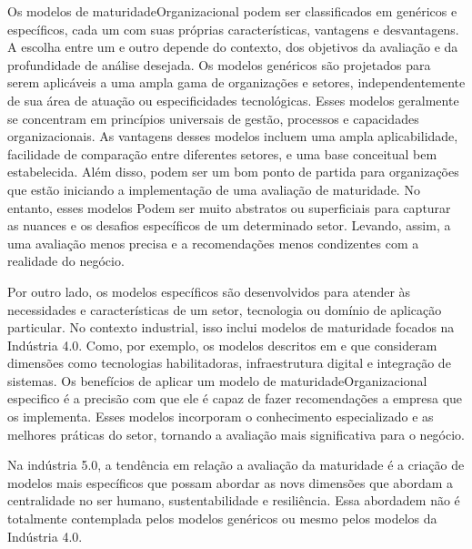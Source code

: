 Os modelos de \gls{maturidadeOrganizacional} podem ser classificados em genéricos e específicos, cada um com suas próprias características, vantagens e desvantagens.
A escolha entre um e outro depende do contexto, dos objetivos da avaliação e da profundidade de análise desejada. 
Os modelos genéricos são projetados para serem aplicáveis a uma ampla gama de organizações e setores, independentemente de sua área de atuação ou especificidades tecnológicas.
Esses modelos geralmente se concentram em princípios universais de gestão, processos e capacidades organizacionais.
As vantagens desses modelos incluem uma ampla aplicabilidade, facilidade de comparação entre diferentes setores, e uma base conceitual bem estabelecida.
Além disso, podem ser um bom ponto de partida para organizações que estão iniciando a implementação de uma avaliação de maturidade.
No entanto, esses modelos Podem ser muito abstratos ou superficiais para capturar as nuances e os desafios específicos de um determinado setor.
Levando, assim, a uma avaliação menos precisa e a recomendações menos condizentes com a realidade do negócio. %

Por outro lado, os modelos específicos são desenvolvidos para atender às necessidades e características de um setor, tecnologia ou domínio de aplicação particular.
No contexto industrial, isso inclui modelos de maturidade focados na Indústria 4.0.
Como, por exemplo, os modelos descritos em  e  que consideram dimensões como tecnologias habilitadoras, infraestrutura digital e integração de sistemas.
Os benefícios de aplicar um modelo de \gls{maturidadeOrganizacional} especifico é a precisão com que ele é capaz de fazer recomendações a empresa que os implementa.
Esses modelos incorporam o conhecimento especializado e as melhores práticas do setor, tornando a avaliação mais significativa para o negócio.

Na indústria 5.0, a tendência em relação a avaliação da maturidade é a criação de modelos mais específicos que possam abordar as novs dimensões que abordam a centralidade no ser humano, sustentabilidade e resiliência.
Essa abordadem não é totalmente contemplada pelos modelos genéricos ou mesmo pelos modelos da Indústria 4.0. %

